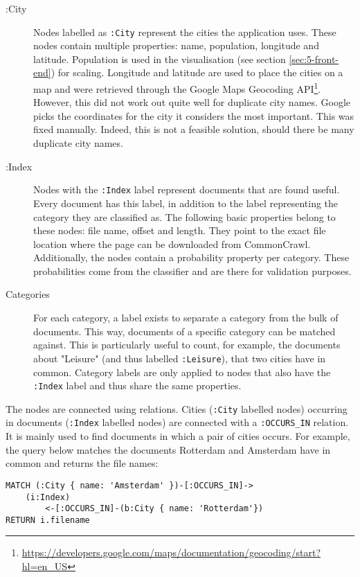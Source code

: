 \begin{description}
\item[:City] Nodes labelled as \texttt{:City} represent the cities the application uses. These nodes contain multiple properties: name, population, longitude and latitude. Population is used in the visualisation (see section \ref{sec:5-front-end}) for scaling. Longitude and latitude are used to place the cities on a map and were retrieved through the Google Maps Geocoding API\footnote{\url{https://developers.google.com/maps/documentation/geocoding/start?hl=en_US}}. However, this did not work out quite well for duplicate city names. Google picks the coordinates for the city it considers the most important. This was fixed manually. Indeed, this is not a feasible solution, should there be many duplicate city names.
\item[:Index] Nodes with the \texttt{:Index} label represent documents that are found useful. Every document has this label, in addition to the label representing the category they are classified as. The following basic properties belong to these nodes: file name, offset and length. They point to the exact file location where the page can be downloaded from CommonCrawl. Additionally, the nodes contain a probability property per category. These probabilities come from the classifier and are there for validation purposes.
\item[Categories] For each category, a label exists to separate a category from the bulk of documents. This way, documents of a specific category can be matched against. This is particularly useful to count, for example, the documents about "Leisure" (and thus labelled \texttt{:Leisure}), that two cities have in common. Category labels are only applied to nodes that also have the \texttt{:Index} label and thus share the same properties.
\end{description}

The nodes are connected using relations. Cities (\texttt{:City} labelled nodes) occurring in documents (\texttt{:Index} labelled nodes) are connected with a \texttt{:OCCURS\_IN} relation. It is mainly used to find documents in which a pair of cities occurs. For example, the query below matches the documents Rotterdam and Amsterdam have in common and returns the file names:

\begin{lstlisting}[language=cypher, caption={Querying documents containing two cities}, label={lst:query-occ}]
MATCH (:City { name: 'Amsterdam' })-[:OCCURS_IN]->
    (i:Index)
        <-[:OCCURS_IN]-(b:City { name: 'Rotterdam'})
RETURN i.filename
\end{lstlisting}

